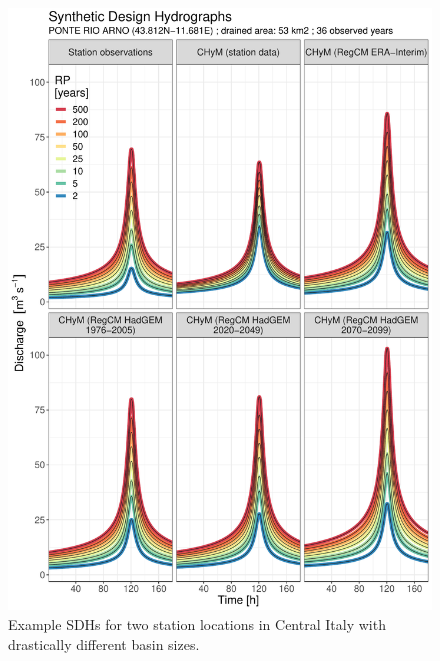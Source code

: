 \begin{figure}
        \includegraphics[width=0.45\textheight]{figures/valid_Q/SDH/id81_SDH_reg9_22}
    \decoRule
    \caption[Example SDHs (2)]{
        Example SDHs for two station locations in Central Italy with drastically different basin sizes.
    }\label{fig:example_sdhs_2}
\end{figure}


